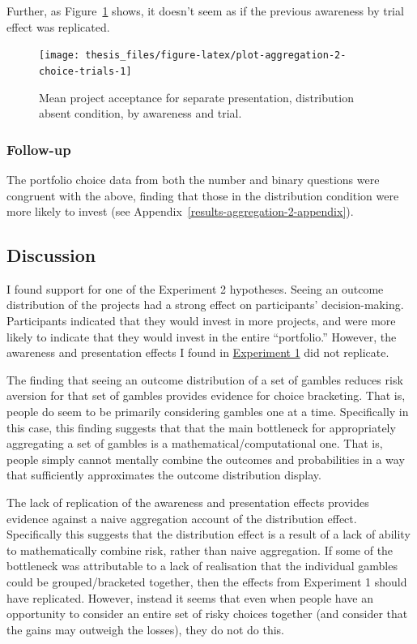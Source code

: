 \documentclass[a4paper, nobind, dvipsnames]{templates/ociamthesis}
\theoremstyle{definition}
\theoremstyle{definition}
\theoremstyle{definition}
\theoremstyle{definition}
\theoremstyle{remark}
\begin{document}
Further, as Figure~\ref{fig:plot-aggregation-2-choice-trials} shows, it
doesn't seem as if the previous awareness by trial effect was replicated.



\begin{figure}
\texttt{[image: thesis\_files/figure-latex/plot-aggregation-2-choice-trials-1]} \caption{Mean project acceptance for separate presentation, distribution absent condition, by awareness and trial.}\label{fig:plot-aggregation-2-choice-trials}
\end{figure}

\subsubsection{Follow-up}

The portfolio choice data from both the number and binary questions were
congruent with the above, finding that those in the distribution condition were
more likely to invest (see Appendix~\ref{results-aggregation-2-appendix}).

\hypertarget{discussion-aggregation-4}{%
\subsection{Discussion}\label{discussion-aggregation-4}}

I found support for one of the Experiment 2 hypotheses. Seeing an outcome
distribution of the projects had a strong effect on participants'
decision-making. Participants indicated that they would invest in more projects,
and were more likely to indicate that they would invest in the entire
``portfolio.'' However, the awareness and presentation effects I found in
\protect\hyperlink{results-aggregation-1}{Experiment 1} did not replicate.

The finding that seeing an outcome distribution of a set of gambles reduces risk
aversion for that set of gambles provides evidence for choice bracketing. That
is, people do seem to be primarily considering gambles one at a time.
Specifically in this case, this finding suggests that that the main bottleneck
for appropriately aggregating a set of gambles is a mathematical/computational
one. That is, people simply cannot mentally combine the outcomes and
probabilities in a way that sufficiently approximates the outcome distribution
display.

The lack of replication of the awareness and presentation effects provides
evidence against a naive aggregation account of the distribution effect.
Specifically this suggests that the distribution effect is a result of a lack of
ability to mathematically combine risk, rather than naive aggregation. If some
of the bottleneck was attributable to a lack of realisation that the individual
gambles could be grouped/bracketed together, then the effects from Experiment 1
should have replicated. However, instead it seems that even when people have an
opportunity to consider an entire set of risky choices together (and consider
that the gains may outweigh the losses), they do not do this.
\end{document}
